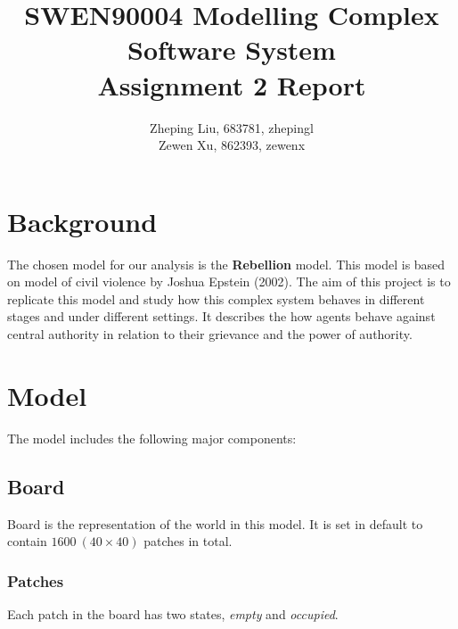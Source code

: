 \documentclass[11pt]{article}
\title{SWEN90004 Modelling Complex Software System\\
        \textbf{Assignment 2 Report}}
\author{Zheping Liu, 683781, zhepingl\\
        Zewen Xu, 862393, zewenx}
\date{}
\begin{document}
    \maketitle
    \section{Background}
        The chosen model for our analysis is the \textbf{Rebellion} model. 
        This model is based on model of civil violence by Joshua Epstein (2002).
        The aim of this project is to replicate this model and study how this 
        complex system behaves in different stages and under different settings.
        It describes the how agents behave against central authority in relation
        to their grievance and the power of authority. 
        
    \section{Model}
        The model includes the following major components:
        \subsection{Board}
        Board is the representation of the world in this model. It is set in default
        to contain $1600\:(40 \times 40)$ patches in total.
        \subsubsection{Patches}
        Each patch in the board has two states, \textit{empty} and \textit{occupied}.
\end{document}
